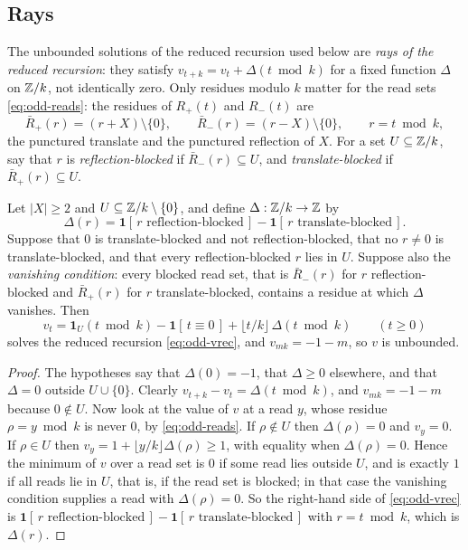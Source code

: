 \subsection{Rays}
\label{sec:odd-rays}

The unbounded solutions of the reduced recursion used below are
\emph{rays of the reduced recursion}: they satisfy
$v_{t+k}=v_t+\Delta(t\bmod k)$ for a fixed function $\Delta$ on $\mathbb{Z}/k$, not
identically zero. Only residues modulo $k$ matter for the read sets
\eqref{eq:odd-reads}: the residues of $R_+(t)$ and $R_-(t)$ are
\begin{equation}
\bar R_+(r)=(r+X)\setminus\{0\},
\qquad
\bar R_-(r)=(r-X)\setminus\{0\},
\qquad r=t\bmod k,
\end{equation}
the punctured translate and the punctured reflection of $X$. For a set
$U\subseteq\mathbb{Z}/k$, say that $r$ is \emph{reflection-blocked} if
$\bar R_-(r)\subseteq U$, and \emph{translate-blocked} if
$\bar R_+(r)\subseteq U$.

\begin{lemma}
\label{lem:odd-ray}
Let $|X|\ge2$ and $U\subseteq\mathbb{Z}/k\setminus\{0\}$, and define
$\Delta:\mathbb{Z}/k\to\mathbb{Z}$ by
\begin{equation}
\Delta(r)=\mathbf 1[\,r\text{ reflection-blocked}\,]-\mathbf 1[\,r\text{ translate-blocked}\,].
\label{eq:odd-raycond}
\end{equation}
Suppose that $0$ is translate-blocked and not reflection-blocked, that no
$r\ne0$ is translate-blocked, and that every reflection-blocked $r$ lies in
$U$. Suppose also the \emph{vanishing condition}: every blocked read set, that
is $\bar R_-(r)$ for $r$ reflection-blocked and $\bar R_+(r)$ for $r$
translate-blocked, contains a residue at which $\Delta$ vanishes. Then
\[
v_t=\mathbf 1_U(t\bmod k)-\mathbf 1[\,t\equiv0\,]+\lfloor t/k\rfloor\,\Delta(t\bmod
k)\qquad(t\ge0)
\]
solves the reduced recursion \eqref{eq:odd-vrec}, and $v_{mk}=-1-m$, so $v$
is unbounded.
\end{lemma}

\begin{proof}
The hypotheses say that $\Delta(0)=-1$, that $\Delta\ge0$ elsewhere, and
that $\Delta=0$ outside $U\cup\{0\}$. Clearly $v_{t+k}-v_t=\Delta(t\bmod k)$,
and $v_{mk}=-1-m$ because $0\notin U$.
Now look at the value of $v$ at a read $y$, whose residue $\rho=y\bmod k$ is
never $0$, by \eqref{eq:odd-reads}. If $\rho\notin U$ then $\Delta(\rho)=0$ and $v_y=0$. If $\rho\in
U$ then $v_y=1+\lfloor y/k\rfloor\Delta(\rho)\ge1$, with equality when
$\Delta(\rho)=0$. Hence the minimum of $v$ over a read set is $0$ if some
read lies outside $U$, and is exactly $1$ if all reads lie in $U$, that is,
if the read set is blocked; in that case the vanishing condition supplies a
read with $\Delta(\rho)=0$. So the right-hand side of \eqref{eq:odd-vrec} is
$\mathbf 1[\,r\text{ reflection-blocked}\,]-\mathbf 1[\,r\text{ translate-blocked}\,]$
with $r=t\bmod k$, which is $\Delta(r)$.
\end{proof}

